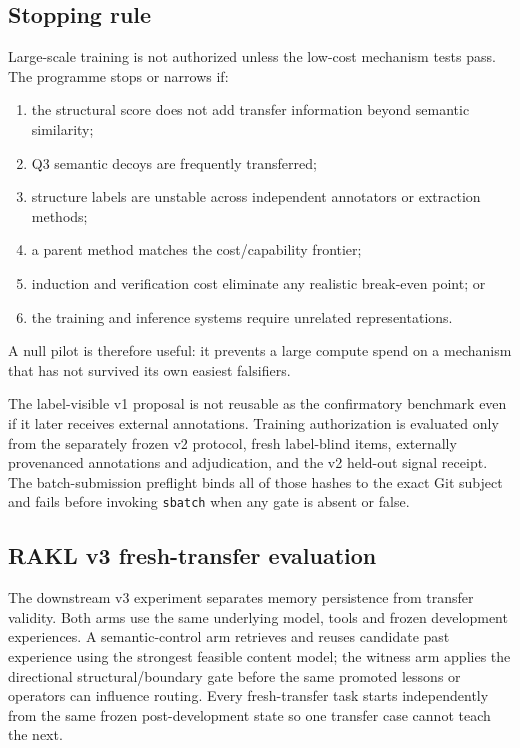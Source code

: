 \subsection{Stopping rule}

Large-scale training is not authorized unless the low-cost mechanism tests pass. The programme stops or narrows if:
\begin{enumerate}[leftmargin=*]
\item the structural score does not add transfer information beyond semantic similarity;
\item Q3 semantic decoys are frequently transferred;
\item structure labels are unstable across independent annotators or extraction methods;
\item a parent method matches the cost/capability frontier;
\item induction and verification cost eliminate any realistic break-even point; or
\item the training and inference systems require unrelated representations.
\end{enumerate}

A null pilot is therefore useful: it prevents a large compute spend on a mechanism that has not survived its own easiest falsifiers.

The label-visible v1 proposal is not reusable as the confirmatory benchmark even
if it later receives external annotations.  Training authorization is evaluated
only from the separately frozen v2 protocol, fresh label-blind items, externally
provenanced annotations and adjudication, and the v2 held-out signal receipt.  The
batch-submission preflight binds all of those hashes to the exact Git subject and
fails before invoking \texttt{sbatch} when any gate is absent or false.


\subsection{RAKL v3 fresh-transfer evaluation}
The downstream v3 experiment separates memory persistence from transfer validity. Both arms use the same underlying model, tools and frozen development experiences. A semantic-control arm retrieves and reuses candidate past experience using the strongest feasible content model; the witness arm applies the directional structural/boundary gate before the same promoted lessons or operators can influence routing. Every fresh-transfer task starts independently from the same frozen post-development state so one transfer case cannot teach the next.


